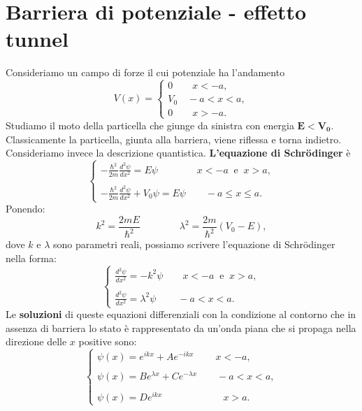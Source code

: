 \documentclass[a4paper,12pt,twoside]{book}
\begin{document}
\section{Barriera di potenziale -  effetto tunnel}
Consideriamo un campo di forze il cui potenziale ha l'andamento
\begin{equation}
V(x)=
\begin{cases}
0 \qquad x<-a,\\
V_0 \quad -a<x<a,\\
0 \qquad x>-a.
\end{cases}
\end{equation}
Studiamo il moto della particella che giunge da sinistra con energia $\mathbf{E<V_0}$. Classicamente la particella, giunta alla barriera, viene riflessa e torna indietro.\\
Consideriamo invece la descrizione quantistica. \textbf{L'equazione di Schr\"{o}dinger} è
\begin{equation}
\begin{cases}
\displaystyle{-\frac{\hbar ^2}{2m}\frac{d^2 \psi}{d x^2}=E \psi \qquad \qquad x <-a \ \textrm{ e }\  x>a,}\\
\\
\displaystyle{-\frac{\hbar ^2}{2m}\frac{d^2 \psi}{d x^2}+V_0 \psi=E \psi \qquad -a  \leq x \leq a.}
\end{cases}
\end{equation}
Ponendo:
\begin{equation}
k^2= \frac{2mE}{\hbar ^2} \qquad \qquad \lambda ^2= \frac{2m}{\hbar ^2} \left( V_0 - E \right),
\end{equation}
dove $k$ e $\lambda $ sono parametri reali, possiamo scrivere l'equazione di Schr\"{o}dinger nella forma:
\begin{equation}
\begin{cases}
\displaystyle{\frac{d^2 \psi}{d x^2}= -k ^2 \psi \qquad  x <-a \ \textrm{ e }\  x>a,}\\
\\
\displaystyle{\frac{d^2 \psi}{d x^2}= \lambda ^2 \psi \qquad 	\ -a  < x < a.}
\end{cases}
\end{equation}
Le \textbf{soluzioni} di queste equazioni differenziali con la condizione al contorno che in assenza di barriera lo stato è rappresentato da un'onda piana che si propaga nella direzione delle $x$ positive sono:
\begin{equation}
\begin{cases}
\displaystyle{\psi (x) = e^{ikx}+Ae^{-ikx} \qquad \ x <-a,}\\
\\
\displaystyle{\psi (x) = Be^{\lambda x}+Ce^{-\lambda x} \qquad  -a< x <a,}\\
\\
\displaystyle{\psi (x) = De^{ikx} \qquad \qquad \qquad \ x >a.}
\end{cases}
\end{equation}
\end{document}
